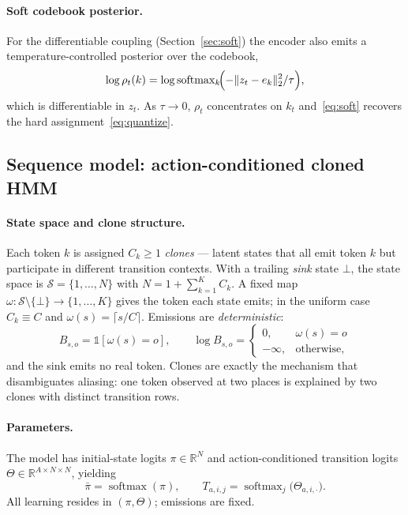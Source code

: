 \documentclass[twocolumn,10pt]{article}
\newcommand{\R}{\mathbb{R}}
\begin{document}
\paragraph{Soft codebook posterior.}
For the differentiable coupling (Section~\ref{sec:soft}) the encoder also
emits a temperature-controlled posterior over the codebook,
\begin{equation}
\log\rho_t(k) = \log\operatorname{softmax}_{k}
   \!\Bigl(-\lVert z_t-e_k\rVert_2^2/\tau\Bigr),
\label{eq:soft}
\end{equation}
which is differentiable in $z_t$. As $\tau\to0$, $\rho_t$ concentrates on
$k_t$ and~\eqref{eq:soft} recovers the hard assignment~\eqref{eq:quantize}.

\subsection{Sequence model: action-conditioned cloned HMM}
\label{sec:cscg}

\paragraph{State space and clone structure.}
Each token $k$ is assigned $C_k\ge1$ \emph{clones} --- latent states that all
emit token $k$ but participate in different transition contexts. With a
trailing \emph{sink} state $\bot$, the state space is
$\mathcal{S}=\{1,\dots,N\}$ with $N=1+\sum_{k=1}^{K}C_k$. A fixed map
$\omega:\mathcal{S}\!\setminus\!\{\bot\}\to\{1,\dots,K\}$ gives the token each
state emits; in the uniform case $C_k\equiv C$ and
$\omega(s)=\lceil s/C\rceil$. Emissions are \emph{deterministic}:
\begin{equation}
B_{s,o}=\mathbb{1}[\omega(s)=o],\qquad
\log B_{s,o}=\begin{cases}0,&\omega(s)=o\\-\infty,&\text{otherwise,}\end{cases}
\end{equation}
and the sink emits no real token. Clones are exactly the mechanism that
disambiguates aliasing: one token observed at two places is explained by two
clones with distinct transition rows.

\paragraph{Parameters.}
The model has initial-state logits $\pi\in\R^{N}$ and action-conditioned
transition logits $\Theta\in\R^{A\times N\times N}$, yielding
\begin{equation}
\bar\pi=\operatorname{softmax}(\pi),\qquad
T_{a,i,j}=\operatorname{softmax}_{j}\bigl(\Theta_{a,i,\cdot}\bigr).
\end{equation}
All learning resides in $(\pi,\Theta)$; emissions are fixed.
\end{document}

